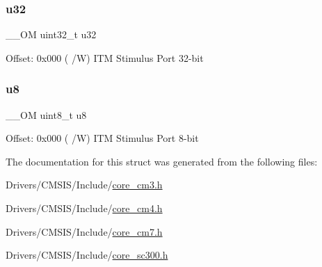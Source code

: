 \subsubsection{\texorpdfstring{u32}{u32}}
{\footnotesize\ttfamily \+\_\+\+\_\+\+OM uint32\+\_\+t u32}

Offset\+: 0x000 ( /W) I\+TM Stimulus Port 32-\/bit \mbox{\label{struct_i_t_m___type_a4c0550e859d614c607bd4b575f05425c}} 
\subsubsection{\texorpdfstring{u8}{u8}}
{\footnotesize\ttfamily \+\_\+\+\_\+\+OM uint8\+\_\+t u8}

Offset\+: 0x000 ( /W) I\+TM Stimulus Port 8-\/bit 

The documentation for this struct was generated from the following files\+:\begin{DoxyCompactItemize}
\item 
Drivers/\+C\+M\+S\+I\+S/\+Include/\mbox{\hyperlink{core__cm3_8h}{core\+\_\+cm3.\+h}}\item 
Drivers/\+C\+M\+S\+I\+S/\+Include/\mbox{\hyperlink{core__cm4_8h}{core\+\_\+cm4.\+h}}\item 
Drivers/\+C\+M\+S\+I\+S/\+Include/\mbox{\hyperlink{core__cm7_8h}{core\+\_\+cm7.\+h}}\item 
Drivers/\+C\+M\+S\+I\+S/\+Include/\mbox{\hyperlink{core__sc300_8h}{core\+\_\+sc300.\+h}}\end{DoxyCompactItemize}
